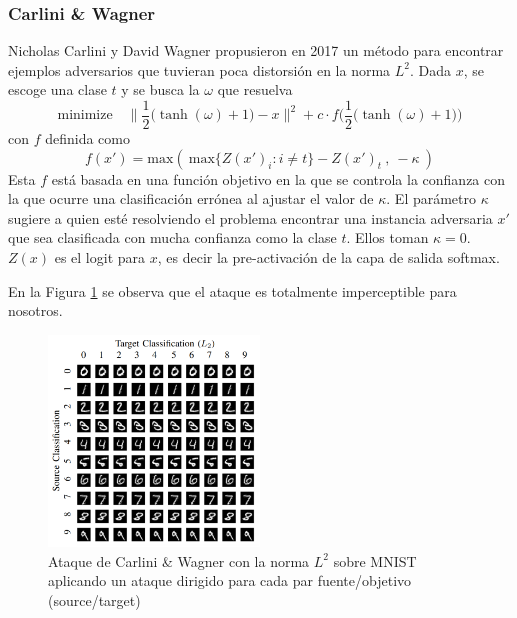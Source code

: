    

\subsubsection{Carlini \& Wagner}
Nicholas Carlini y David Wagner \cite{carlini2017evaluating} propusieron en 2017 un método para encontrar ejemplos adversarios que tuvieran poca distorsión en la norma $L^2$. Dada $x$, se escoge una clase $t$ y se busca la $\omega$ que resuelva
\begin{equation*}
    \text{minimize} \quad \Big\lVert \dfrac{1}{2}\big(\tanh(\omega) + 1\big) - x \Big\rVert^2 + c\cdot f\bigg(\dfrac{1}{2}\big(\tanh(\omega) + 1\big)\bigg)
\end{equation*}
con $f$ definida como
\begin{equation*}
    f(x') = \text{max}(\ \text{max}\{Z(x')_i : i\neq t\} - Z(x')_t\ ,\ -\kappa\ )
\end{equation*}
Esta $f$ está basada en una función objetivo en la que se controla la confianza con la que ocurre una clasificación errónea al ajustar el valor de $\kappa$. El parámetro $\kappa$ sugiere a quien esté resolviendo el problema encontrar una instancia adversaria $x'$ que sea clasificada con mucha confianza como la clase $t$. Ellos toman $\kappa = 0$. $Z(x)$ es el logit para $x$, es decir la pre-activación de la capa de salida softmax.

En la Figura \ref{CW} se observa que el ataque es totalmente imperceptible para nosotros.

\begin{figure}[h!]
    \centering
    \includegraphics[width=0.5\textwidth]{images/CW/CW_L2.png}
    \caption{Ataque de Carlini \& Wagner con la norma $L^2$ sobre MNIST aplicando un ataque dirigido para cada par fuente/objetivo (source/target)}
    \label{CW}
\end{figure}



